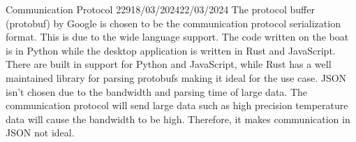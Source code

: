 \documentclass[12pt]{article}
\begin{document}
\begin{logbook-entry}{Communication Protocol 2}{29}{18/03/2024}{22/03/2024}
The protocol buffer (protobuf) by Google is chosen to be the communication protocol serialization format.
This is due to the wide language support.
The code written on the boat is in Python while the desktop application is written in Rust and JavaScript.
There are built in support for Python and JavaScript, while Rust has a well maintained library for parsing protobufs making it ideal for the use case.
JSON isn't chosen due to the bandwidth and parsing time of large data.
The communication protocol will send large data such as high precision temperature data will cause the bandwidth to be high.
Therefore, it makes communication in JSON not ideal.
\end{logbook-entry}
\end{document}
